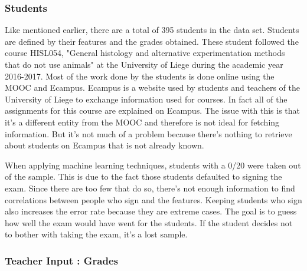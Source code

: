 \documentclass[a4paper,11pt]{report}
\numberwithin{figure}{section} %
\begin{document}
    	\subsubsection{Students}
    Like mentioned earlier, there are a total of 395 students in the data set.
    Students are defined by their features and the grades obtained.
    These student followed the course HISL054, "General histology and alternative experimentation methods that do not use animals" at the University of Liege during the academic year 2016-2017.
    Most of the work done by the students is done online using the MOOC and Ecampus.
    Ecampus is a website used by students and teachers of the University of Liege to exchange information used for courses.
    In fact all of the assignments for this course are explained on Ecampus.
    The issue with this is that it's a different entity from the MOOC and therefore is not ideal for fetching information.
    But it's not much of a problem because there's nothing to retrieve about students on Ecampus that is not already known.\newline
    
    When applying machine learning techniques, students with a 0/20 were taken out of the sample.
    This is due to the fact those students defaulted to signing the exam.
    Since there are too few that do so, there's not enough information to find correlations between people who sign and the features.
    Keeping students who sign also increases the error rate because they are extreme cases.
    The goal is to guess how well the exam would have went for the students.
    If the student decides not to bother with taking the exam, it's a lost sample.\newline
    
    	\subsubsection{Teacher Input : Grades}
    
    
\end{document}
